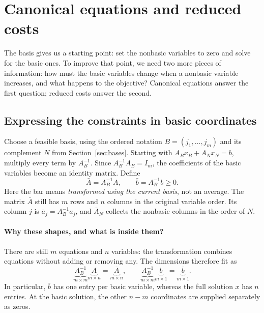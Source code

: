 \documentclass[11pt,a4paper]{article}
\begin{document}
\section{Canonical equations and reduced costs}\label{sec:canonical}
The basis gives us a starting point: set the nonbasic variables to zero and
solve for the basic ones. To improve that point, we need two more pieces of
information: how must the basic variables change when a nonbasic variable
increases, and what happens to the objective? Canonical equations answer the
first question; reduced costs answer the second.

\subsection{Expressing the constraints in basic coordinates}
Choose a feasible basis, using the ordered notation $B=(j_1,\ldots,j_m)$
and its complement $N$ from Section~\ref{sec:bases}. Starting with
$A_Bx_B+A_Nx_N=b$, multiply every term by $A_B^{-1}$. Since
$A_B^{-1}A_B=I_m$, the coefficients of the basic variables become an identity
matrix. Define
\begin{equation}\label{eq:transformed}
  \bar A=A_B^{-1}A,\qquad \bar b=A_B^{-1}b\geq0.
\end{equation}
Here the bar means \emph{transformed using the current basis}, not an average.
The matrix $\bar A$ still has $m$ rows and $n$ columns in the original variable
order. Its column $j$ is $\bar a_j=A_B^{-1}a_j$, and $\bar A_N$ collects
the nonbasic columns in the order of $N$.

\paragraph{Why these shapes, and what is inside them?}
There are still $m$ equations and $n$ variables: the transformation combines
equations without adding or removing any. The dimensions therefore fit as
\[
  \underbrace{A_B^{-1}}_{m\times m}
  \underbrace{A}_{m\times n}
  =\underbrace{\bar A}_{m\times n},
  \qquad
  \underbrace{A_B^{-1}}_{m\times m}
  \underbrace{b}_{m\times1}
  =\underbrace{\bar b}_{m\times1}.
\]
In particular, $\bar b$ has one entry per basic variable, whereas the full
solution $x$ has $n$ entries. At the basic solution, the other $n-m$
coordinates are supplied separately as zeros.
\end{document}
